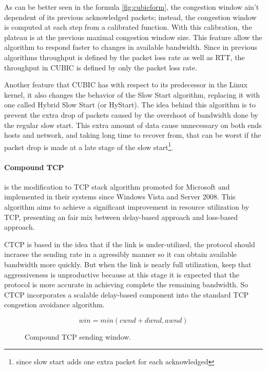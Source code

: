 As can be better seen in the formula \ref{fig:cubicform}, the congestion
window ain't dependent of its previous acknowledged packets; instead, the
congestion window is computed at each step from a calibrated function. With
this calibration, the plateau is at the previous maximal congestion window
size. This feature allow the algorithm to respond faster to changes in
available bandwidth. Since in previous algorithms throughput is defined by the
packet loss rate as well as RTT, the throughput in CUBIC is defined by only
the packet loss rate.

Another feature that CUBIC has with respect to its predecessor in the Linux
kernel, it also changes the behavior of the Slow Start algorithm, replacing it
with one called Hybrid Slow Start (or HyStart)\cite{HaElephants}. The idea
behind this algorithm is to prevent the extra drop of packets caused by the
overshoot of bandwidth done by the regular slow start. This extra amount of
data cause unnecessary on both ends hosts and network, and taking long time to
recover from, that can be worst if the packet drop is made at a late stage of
the slow start\footnote{since slow start adds one extra packet for each
acknowledged}.

\paragraph{Compound TCP} is the modification to TCP stack algorithm promoted
for Microsoft and implemented in their systems since Windows Vista and Server
2008. This algorithm aims to achieve a significant improvement in resource
utilization by TCP, presenting an fair mix between delay-based approach and
loss-based approach.

CTCP is based in the idea that if the link is under-utilized, the protocol
should incraese the sending rate in a agressibly manner so it can obtain
available bandwidth more quickly. But when the link is nearly full
utilization, keep that aggressiveness is unproductive because at this stage it
is expected that the protocol is more accurate in achieving complete the
remaining bandwidth. So CTCP incorporates a scalable delay-based component
into the standard TCP congestion avoidance algorithm\cite{4146841}.

\begin{figure}
  \begin{center}
    \[ win = min(cwnd + dwnd, awnd)\]
  \end{center}
  \caption{Compound TCP sending window.\protect\footnotemark}
  \label{fig:ctcpform}
\end{figure}

